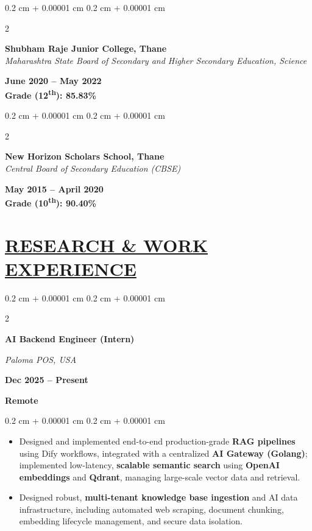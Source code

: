 \documentclass[10pt, letterpaper]{article}
\newenvironment{highlights}{
    \begin{itemize}[
        topsep=0.05 cm,
        parsep=0 cm,
        partopsep=0pt,
        itemsep=0pt,
        leftmargin=0.4 cm + 10pt
    ]
}{
    \end{itemize}
} %
\newenvironment{onecolentry}{
    \begin{adjustwidth}{
        0.2 cm + 0.00001 cm
    }{
        0.2 cm + 0.00001 cm
    }
}{
    \end{adjustwidth}
} %
\newenvironment{twocolentry}[2][]{
    \onecolentry
    \def\secondColumn{#2}
    \setcolumnwidth{\fill, 5.0 cm}
    \begin{paracol}{2}
}{
    \switchcolumn \raggedleft \secondColumn
    \end{paracol}
    \endonecolentry
} %
\begin{document}
\begin{twocolentry}{
             
\textbf{June 2020 – May 2022} \\ \textbf{Grade (12\textsuperscript{th}): 85.83\%}}
   \textbf{Shubham Raje Junior College, Thane} \\
   \textit{Maharashtra State Board of Secondary and Higher Secondary Education, Science}
\end{twocolentry}

\begin{twocolentry}{
             
\textbf{May 2015 – April 2020} \\ \textbf{Grade (10\textsuperscript{th}): 90.40\%}}
   \textbf{New Horizon Scholars School, Thane} \\
   \textit{Central Board of Secondary Education (CBSE)}
\end{twocolentry}

  
    \section{\href{https://www.harjot.info/\#Experience}{RESEARCH \& WORK EXPERIENCE}}


    
       \begin{twocolentry}{
        \textbf{Dec 2025 – Present}
        
        \textbf{Remote}    
      }
    \textbf{AI Backend Engineer (Intern)} 
            
            \textit{Paloma POS, USA}
\end{twocolentry}

\vspace{0.10 cm}
\begin{onecolentry}
    \begin{highlights}
        \item Designed and implemented end-to-end production-grade \textbf{RAG pipelines} using Dify workflows, integrated with a centralized \textbf{AI Gateway (Golang)}; implemented low-latency, \textbf{scalable semantic search} using \textbf{OpenAI embeddings} and \textbf{Qdrant}, managing large-scale vector data and retrieval.

        \item Designed robust, \textbf{multi-tenant knowledge base ingestion} and AI data infrastructure, including automated web scraping, document chunking, embedding lifecycle management, and secure data isolation.

    \end{highlights}
\end{onecolentry}
\end{document}
